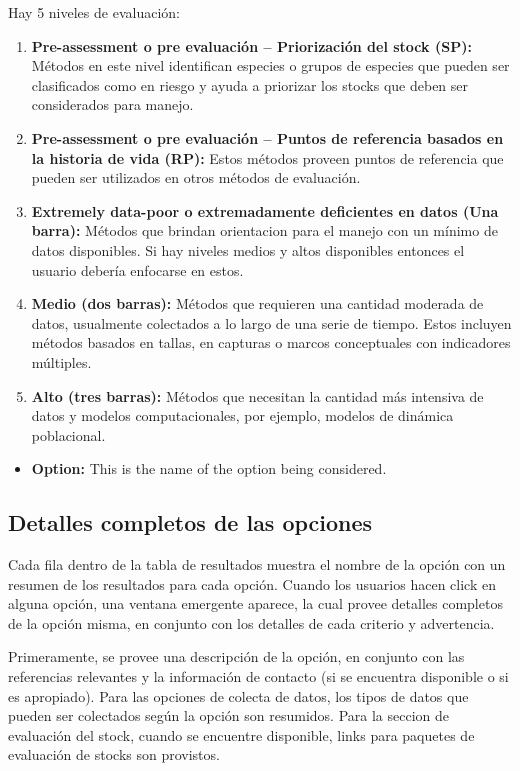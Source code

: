 \documentclass[
  11pt,
]{book}
\providecommand{\tightlist}{%
  \setlength{\itemsep}{0pt}\setlength{\parskip}{0pt}}
\begin{document}
Hay 5 niveles de evaluación:

\begin{enumerate}
\def\labelenumi{\alph{enumi}.}
\item
  \textbf{Pre-assessment o pre evaluación -- Priorización del stock (SP):} Métodos en este nivel identifican especies o grupos de especies que pueden ser clasificados como en riesgo y ayuda a priorizar los stocks que deben ser considerados para manejo.
\item
  \textbf{Pre-assessment o pre evaluación -- Puntos de referencia basados en la historia de vida (RP):} Estos métodos proveen puntos de referencia que pueden ser utilizados en otros métodos de evaluación.
\item
  \textbf{Extremely data-poor o extremadamente deficientes en datos (Una barra):} Métodos que brindan orientacion para el manejo con un mínimo de datos disponibles. Si hay niveles medios y altos disponibles entonces el usuario debería enfocarse en estos.
\item
  \textbf{Medio (dos barras):} Métodos que requieren una cantidad moderada de datos, usualmente colectados a lo largo de una serie de tiempo. Estos incluyen métodos basados en tallas, en capturas o marcos conceptuales con indicadores múltiples.
\item
  \textbf{Alto (tres barras):} Métodos que necesitan la cantidad más intensiva de datos y modelos computacionales, por ejemplo, modelos de dinámica poblacional.
\end{enumerate}

\begin{itemize}
\tightlist
\item
  \textbf{Option:} This is the name of the option being considered.
\end{itemize}

\hypertarget{detalles-completos-de-las-opciones}{%
\subsection{Detalles completos de las opciones}\label{detalles-completos-de-las-opciones}}

Cada fila dentro de la tabla de resultados muestra el nombre de la opción con un resumen de los resultados para cada opción. Cuando los usuarios hacen click en alguna opción, una ventana emergente aparece, la cual provee detalles completos de la opción misma, en conjunto con los detalles de cada criterio y advertencia.

Primeramente, se provee una descripción de la opción, en conjunto con las referencias relevantes y la información de contacto (si se encuentra disponible o si es apropiado). Para las opciones de colecta de datos, los tipos de datos que pueden ser colectados según la opción son resumidos. Para la seccion de evaluación del stock, cuando se encuentre disponible, links para paquetes de evaluación de stocks son provistos.
\end{document}
